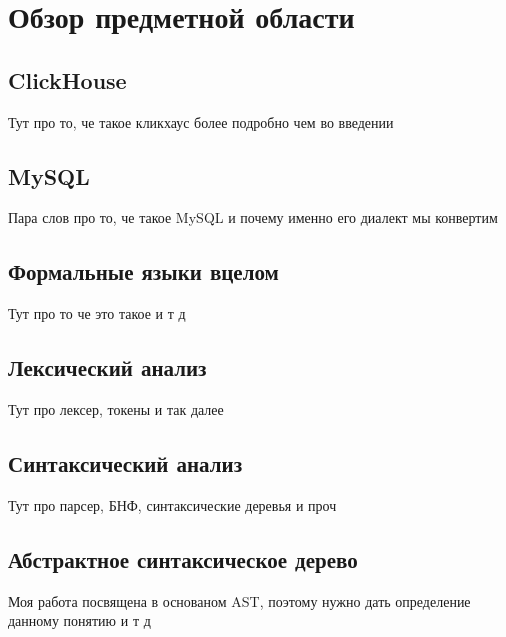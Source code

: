 \section{Обзор предметной области}
\subsection{ClickHouse}
Тут про то, че такое кликхаус более подробно чем во введении

\subsection{MySQL}
Пара слов про то, че такое MySQL и почему именно его диалект мы конвертим

\subsection{Формальные языки вцелом}
Тут про то че это такое и т д

\subsection{Лексический анализ}
Тут про лексер, токены и так далее

\subsection{Синтаксический анализ}
Тут про парсер, БНФ, синтаксические деревья и проч

\subsection{Абстрактное синтаксическое дерево}
Моя работа посвящена в основаном AST, поэтому нужно дать определение данному понятию и т д

\pagebreak

